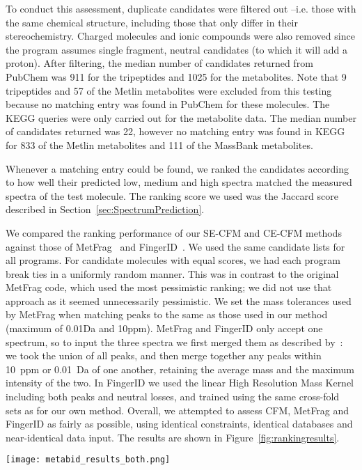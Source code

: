 To conduct this assessment, duplicate candidates were filtered out --i.e. those with the same chemical structure, including those that only differ in their stereochemistry.
Charged molecules and ionic compounds were also removed since the program assumes single fragment, neutral candidates (to which it will add a proton).
After filtering, the median number of candidates returned from PubChem was 911 for the tripeptides and 1025 for the metabolites. 
Note that 9 tripeptides and 57 of the Metlin metabolites were excluded from this testing because no matching entry was found in PubChem for these molecules.
The KEGG queries were only carried out for the metabolite data. 
The median number of candidates returned was 22, however no matching entry was found in KEGG for 833 of the Metlin metabolites and 111 of the MassBank metabolites.

Whenever a matching entry could be found, we ranked the candidates according to how well their predicted low, medium and high spectra matched the measured spectra of the test molecule.
The ranking score we used was the Jaccard score described in Section~\ref{sec:SpectrumPrediction}.

We compared the ranking performance of our SE-CFM and CE-CFM methods against those of MetFrag~\citep{Wolf2010} and FingerID~\citep{Heinonen2012}. 
We used the same candidate lists for all programs. 
For candidate molecules with equal scores, we had each program break ties in a uniformly random manner. This was in contrast to the original MetFrag code, which used the most pessimistic ranking; we did not use that approach as it seemed unnecessarily pessimistic. 
We set the mass tolerances used by MetFrag when matching peaks to the same as those used in our method (maximum of 0.01Da and 10ppm). 
MetFrag and FingerID only accept one spectrum, so to input the three spectra we first merged them as described by~\citep{Wolf2010}: 
we took the union of all peaks, and then merge together any peaks within 10~ppm or 0.01~Da of one another, retaining the average mass and the maximum intensity of the two. 
In FingerID we used the linear High Resolution Mass Kernel including both peaks and neutral losses, and trained using the same cross-fold sets as for our own method.
Overall, we attempted to assess CFM, MetFrag and FingerID as fairly as possible, using identical constraints, identical databases and near-identical data input. 
The results are shown in Figure~\ref{fig:rankingresults}. 

\begin{figure*}
\begin{center}
\texttt{[image: metabid\_results\_both.png]}
\caption{Ranking results for metabolite identification, comparing both CFM variants with MetFrag and FingerID for tripeptides (left), metabolites from Metlin (middle) and validation metabolites from MassBank (right), querying against PubChem within 5~ppm (circles) and KEGG within 0.5~Da (triangles). Note that our methods out-perform both MetFrag and FingerID on all metrics, regardless of the database used.}
\label{fig:rankingresults}
\end{center}
\vspace{-1.25em}
\end{figure*}

